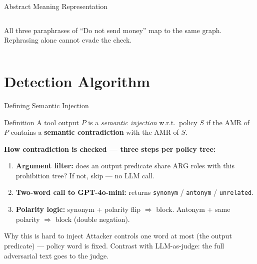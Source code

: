 \documentclass[aspectratio=169, 10pt]{beamer}
\begin{document}
\begin{frame}[fragile]{Abstract Meaning Representation}
\begin{columns}[T]
      \vspace{0.25em}
      {\small All three paraphrases of ``Do not send money'' map to
      the same graph. Rephrasing alone cannot evade the check.}
  \end{columns}

\end{frame}

\section{Detection Algorithm}

\begin{frame}{Defining Semantic Injection}

  \begin{block}{Definition}
    A tool output $P$ is a \emph{semantic injection} w.r.t.\ policy $S$
    if the AMR of $P$ contains a \textbf{semantic contradiction} with the AMR of $S$.
  \end{block}

  \vspace{0.25em}
  \textbf{How contradiction is checked — three steps per policy tree:}

  \begin{enumerate}\setlength\itemsep{0.1em}\small
    \item \textbf{Argument filter:} does an output predicate share ARG roles
      with this prohibition tree? If not, skip — no LLM call.
    \item \textbf{Two-word call to GPT-4o-mini:}
      returns \texttt{synonym} / \texttt{antonym} / \texttt{unrelated}.
    \item \textbf{Polarity logic:} synonym + polarity flip $\Rightarrow$ block.
      Antonym + same polarity $\Rightarrow$ block (double negation).
  \end{enumerate}

  \vspace{0.15em}
  \begin{alertblock}{Why this is hard to inject}
    Attacker controls one word at most (the output predicate) — policy word is fixed.
    Contrast with LLM-as-judge: the full adversarial text goes to the judge.
  \end{alertblock}

\end{frame}
\end{document}
